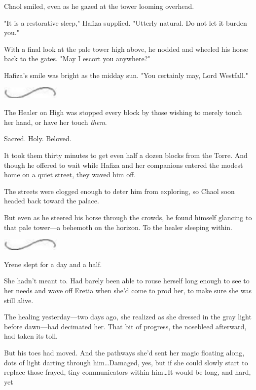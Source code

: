 Chaol smiled, even as he gazed at the tower looming overhead.

"It is a restorative sleep," Hafiza supplied.
"Utterly natural.
Do not let it burden you."

With a final look at the pale tower high above, he nodded and wheeled his horse back to the gates.
"May I escort you anywhere?"

Hafiza's smile was bright as the midday sun.
"You certainly may, Lord Westfall."

\begin{center}
	\includegraphics[width=1.12in,height=0.24in]{images/seperator}
\end{center}

The Healer on High was stopped every block by those wishing to merely touch her hand, or have her touch \emph{them}.

Sacred.
Holy.
Beloved.

It took them thirty minutes to get even half a dozen blocks from the Torre.
And though he offered to wait while Hafiza and her companions entered the modest home on a quiet street, they waved him off.

The streets were clogged enough to deter him from exploring, so Chaol soon headed back toward the palace.

But even as he steered his horse through the crowds, he found himself glancing to that pale tower---a behemoth on the horizon.
To the healer sleeping within.

\begin{center}
	\includegraphics[width=1.12in,height=0.24in]{images/seperator}
\end{center}

Yrene slept for a day and a half.

She hadn't meant to.
Had barely been able to rouse herself long enough to see to her needs and wave off Eretia when she'd come to prod her, to make sure she was still alive.

The healing yesterday---two days ago, she realized as she dressed in the gray light before dawn---had decimated her.
That bit of progress, the nosebleed afterward, had taken its toll.

But his toes had moved.
And the pathways she'd sent her magic floating along, dots of light darting through him\ldots Damaged, yes, but if she could slowly start to replace those frayed, tiny communicators within him\ldots It would be long, and hard, yet 

